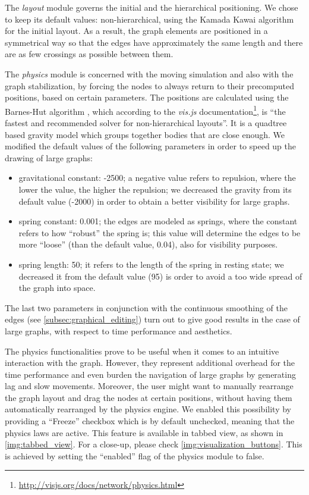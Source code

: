 The \textit{layout} module governs the initial and the hierarchical positioning. We chose to keep its default values: non-hierarchical, using the Kamada Kawai algorithm \cite{Kamada1989} for the initial layout. As a result, the graph elements are positioned in a symmetrical way so that the edges have approximately the same length and there are as few crossings as possible between them.

The \textit{physics} module is concerned with the moving simulation and also with the graph stabilization, by forcing the nodes to always return to their precomputed positions, based on certain parameters. The positions are calculated using the Barnes-Hut algorithm \cite{Barnes1986}, which according to the \textit{vis.js} documentation\footnote{\url{http://visjs.org/docs/network/physics.html}}, is ``the fastest and recommended solver for non-hierarchical layouts''. It is a quadtree based gravity model which groups together bodies that are close enough. We modified the default values of the following parameters in order to speed up the drawing of large graphs:

\begin{itemize}
	\item gravitational constant: -2500; a negative value refers to repulsion, where the lower the value, the higher the repulsion; we decreased the gravity from its default value (-2000) in order to obtain a better visibility for large graphs.
	\item spring constant: 0.001; the edges are modeled as springs, where the constant refers to how ``robust'' the spring is; this value will determine the edges to be more ``loose'' (than the default value, 0.04), also for visibility purposes.
	\item spring length: 50; it refers to the length of the spring in resting state; we decreased it from the default value (95) is order to avoid a too wide spread of the graph into space.
\end{itemize}

The last two parameters in conjunction with the continuous smoothing of the edges (see \autoref{subsec:graphical_editing}) turn out to give good results in the case of large graphs, with respect to time performance and aesthetics.

The physics functionalities prove to be useful when it comes to an intuitive interaction with the graph. However, they represent additional overhead for the time performance and even burden the navigation of large graphs by generating lag and slow movements. Moreover, the user might want to manually rearrange the graph layout and drag the nodes at certain positions, without having them automatically rearranged by the physics engine. We enabled this possibility by providing a ``Freeze'' checkbox which is by default unchecked, meaning that the physics laws are active. This feature is available in tabbed view, as shown in \autoref{img:tabbed_view}. For a close-up, please check \autoref{img:visualization_buttons}. This is achieved by setting the ``enabled'' flag of the physics module to false. 

